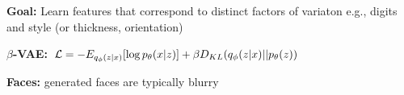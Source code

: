 \textbf{Goal:} Learn features that correspond to distinct factors of variaton e.g., digits and style (or thickness, orientation)

\textbf{$\beta$-VAE:} $\mathcal{L} = -E_{q_\phi(z|x)}[\log p_\theta(x|z)] + \beta D_{KL}(q_\phi(z|x) || p_\theta(z))$\\

\textbf{Faces:} generated faces are typically blurry\\













